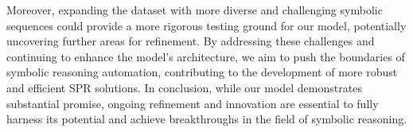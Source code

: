 \documentclass{article}
\begin{document}
Moreover, expanding the dataset with more diverse and challenging symbolic sequences could provide a more rigorous testing ground for our model, potentially uncovering further areas for refinement. By addressing these challenges and continuing to enhance the model's architecture, we aim to push the boundaries of symbolic reasoning automation, contributing to the development of more robust and efficient SPR solutions. In conclusion, while our model demonstrates substantial promise, ongoing refinement and innovation are essential to fully harness its potential and achieve breakthroughs in the field of symbolic reasoning.
\end{document}
